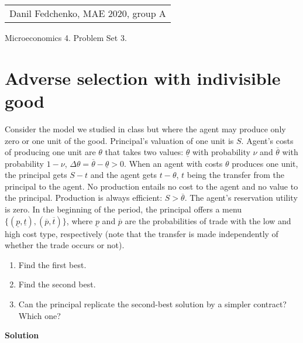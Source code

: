 \documentclass[a4paper]{article}
\begin{document}
	\begin{flushright}
	\begin{tabular}{r}
		Danil Fedchenko, MAE 2020, group A \\
	\end{tabular}
\end{flushright}


\begin{center}
	Microeconomics 4. Problem Set 3.
\end{center}
\section*{Adverse selection with indivisible good}
	Consider the model we studied in class but where the agent may produce only zero or
	one unit of the good. Principal's valuation of one unit is $S$. Agent's costs of producing
	one unit are $\theta$ that takes two values: $\underline{\theta}$ with probability $\nu$ and $\overline{\theta}$ with probability $1-\nu$,
	$\Delta \theta = \overline{\theta} - \underline{\theta} > 0$. When an agent with costs $\theta$ produces one unit, the principal gets $S-t$ and the agent gets $t - \theta$, $t$ being the transfer from the principal to the agent. No production entails no cost to the agent and no value to the principal. Production is always efficient:
	$S > \overline{\theta}$. The agent's reservation utility is zero.
	In the beginning of the period, the principal offers a menu $\{(\underline{p}, \underline{t}), (\overline{p}, \overline{t})\}$, where $\underline{p}$ and $\overline{p}$ are the probabilities of trade with the low and high cost type, respectively (note
	that the transfer is made independently of whether the trade occurs or not).
\begin{enumerate}
	\item Find the first best.
	\item Find the second best.
	\item Can the principal replicate the second-best solution by a simpler contract? Which
one?
\end{enumerate}


\textbf{Solution}
\end{document}
